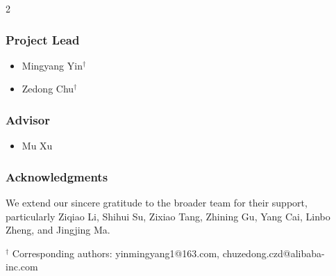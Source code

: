 \begin{multicols}{2}
\begin{itemize}
\end{itemize}

\subsubsection*{Project Lead}
\begin{itemize}
\item Mingyang Yin$^{\dagger}$
\item Zedong Chu$^{\dagger}$
\end{itemize}

\subsubsection*{Advisor}
\begin{itemize}
\item Mu Xu
\end{itemize}

\end{multicols}

\subsubsection*{Acknowledgments}
We extend our sincere gratitude to the broader team for their support, particularly Ziqiao Li, Shihui Su, Zixiao Tang, Zhining Gu, Yang Cai, Linbo Zheng, and Jingjing Ma.

\vfill
\noindent $^{\dagger}$ Corresponding authors: yinmingyang1@163.com, chuzedong.czd@alibaba-inc.com